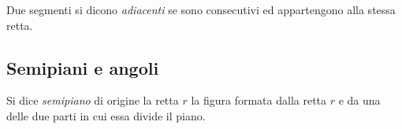 \begin{inaccessibleblock}
 \begin{center} \end{center}
\end{inaccessibleblock}

\begin{definizione}
Due segmenti si dicono \emph{adiacenti} se sono consecutivi ed 
appartengono alla stessa retta.%
\end{definizione}

\begin{inaccessibleblock}
 \begin{center} \end{center}
\end{inaccessibleblock}


\subsection{Semipiani e angoli}

\begin{definizione}
Si dice \emph{semipiano} di origine la retta \(r\) la figura formata 
dalla retta \(r\) e da una delle due parti in cui essa divide il piano. 
\end{definizione}

